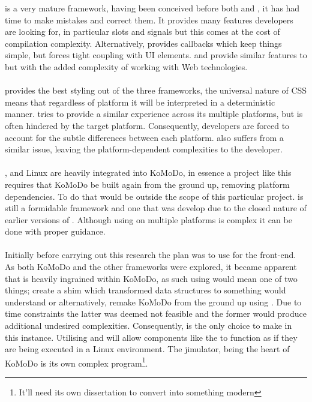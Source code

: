  is a very mature framework, having been conceived before both  and , it has had time to make mistakes and correct them. It provides many features developers are looking for, in particular slots and signals but this comes at the cost of compilation complexity. Alternatively,  provides callbacks which keep things simple, but forces tight coupling with UI elements.  and  provide similar features to  but with the added complexity of working with Web technologies.\\\\
%
 provides the best styling out of the three frameworks, the universal nature of CSS means that regardless of platform it will be interpreted in a deterministic manner.  tries to provide a similar experience across its multiple platforms, but is often hindered by the target platform. Consequently, developers are forced to account for the subtle differences between each platform.  also suffers from a similar issue, leaving the platform-dependent complexities to the developer.\\\\
%
,  and Linux are heavily integrated into KoMoDo, in essence a project like this requires that KoMoDo be built again from the ground up, removing platform dependencies. To do that would be outside the scope of this particular project.  is still a formidable framework and one that was develop due to the closed nature of earlier versions of . Although using  on multiple platforms is complex it can be done with proper guidance.\\\\
%
Initially before carrying out this research the plan was to use  for the front-end. As both KoMoDo and the other frameworks were explored, it became apparent that  is heavily ingrained within KoMoDo, as such using  would mean one of two things; create a shim which transformed  data structures to something  would understand or alternatively, remake KoMoDo from the ground up using . Due to time constraints the latter was deemed not feasible and the former would produce additional undesired complexities. Consequently,  is the only choice to make in this instance. Utilising  and  will allow components like the  to function as if they are being executed in a Linux environment. The jimulator, being the heart of KoMoDo is its own complex program\footnote{It'll need its own dissertation to convert into something modern}.

